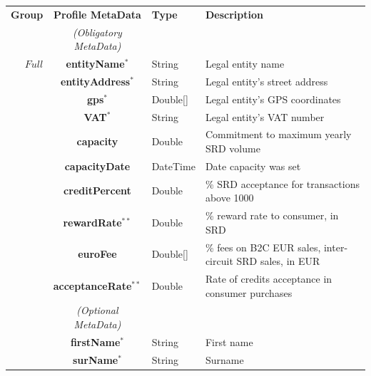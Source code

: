 \setlength{\tabcolsep}{5pt}
\begin{table}[H]
\begin{centering}
\small
{
\begin{tabular}{ r | c | l | l }
\hline
\textbf{Group}	& {\bf Profile MetaData} & {\bf Type} & {\bf Description} \\
\Xhline{1.5pt}
			& \emph{(Obligatory MetaData)} & & \\
\cline{2-2}
$Full$		& {\bf entityName}$^*$		&String	& Legal entity name \\
			& {\bf entityAddress}$^*$		&String	& Legal entity's street address \\
			& {\bf gps}$^*$				&Double[]	& Legal entity's GPS coordinates \\
			& {\bf VAT}$^*$				&String	& Legal entity's VAT number \\
			& {\bf capacity}				&Double	& Commitment to maximum yearly SRD volume \\
			& {\bf capacityDate}			&DateTime & Date capacity was set \\
			& {\bf creditPercent}			&Double	& \% SRD acceptance for transactions above 1000 \\
			& {\bf rewardRate}$^{**}$		&Double	& \% reward rate to consumer, in SRD \\
			& {\bf euroFee}				&Double[]	& \% fees on B2C EUR sales, inter-circuit SRD sales, in EUR \\
			& {\bf acceptanceRate}$^{**}$	&Double	& Rate of credits acceptance in consumer purchases\\
\cline{2-2}
			 & \emph{(Optional MetaData)}& & \\
\cline{2-2}
			& {\bf firstName}$^*$			&String	& First name \\
			& {\bf surName}$^*$			&String	& Surname \\


\end{tabular}}
\end{centering}
\end{table}
